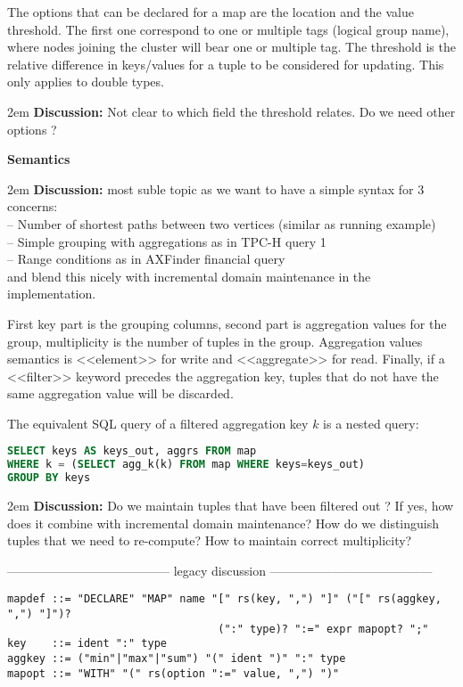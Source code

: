 \documentclass[11pt]{article}
\def\discuss#1{\begingroup\par\leftskip2em {\footnotesize {\bf Discussion:} #1} \par\endgroup}
\begin{document}
The options that can be declared for a map are the location and the value threshold. The first one correspond to one or multiple tags (logical group name), where nodes joining the cluster will bear one or multiple tag. The threshold is the relative difference in keys/values for a tuple to be considered for updating. This only applies to double types. \discuss{Not clear to which field the threshold relates. Do we need other options ?}

{\bf Semantics}
\discuss{most suble topic as we want to have a simple syntax for 3 concerns:\\
-- Number of shortest paths between two vertices (similar as \cite{socialite} running example)\\
-- Simple grouping with aggregations as in TPC-H query 1\\
-- Range conditions as in AXFinder financial query\\
and blend this nicely with incremental domain maintenance in the implementation.}

First key part is the grouping columns, second part is aggregation values for the group, multiplicity is the number of tuples in the group. Aggregation values semantics is <<element>> for write and <<aggregate>> for read. Finally, if a <<filter>> keyword precedes the aggregation key, tuples that do not have the same aggregation value will be discarded.

The equivalent SQL query of a filtered aggregation key $k$ is a nested query:
\begin{lstlisting}[language=sql]
SELECT keys AS keys_out, aggrs FROM map
WHERE k = (SELECT agg_k(k) FROM map WHERE keys=keys_out)
GROUP BY keys
\end{lstlisting}
\discuss{Do we maintain tuples that have been filtered out ? If yes, how does it combine with incremental domain maintenance? How do we distinguish tuples that we need to re-compute? How to maintain correct multiplicity?}








{\center --------------------------------------- legacy discussion ---------------------------------------}
\begin{verbatim}
mapdef ::= "DECLARE" "MAP" name "[" rs(key, ",") "]" ("[" rs(aggkey, ",") "]")? 
                                 (":" type)? ":=" expr mapopt? ";" 
key    ::= ident ":" type
aggkey ::= ("min"|"max"|"sum") "(" ident ")" ":" type
mapopt ::= "WITH" "(" rs(option ":=" value, ",") ")"
\end{verbatim}
\end{document}

